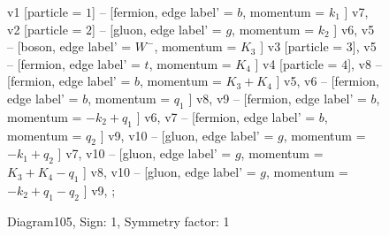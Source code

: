 \documentclass{revtex4}
\begin{document}
\begin{figure}[!htb]
\begin{center}
{v1 [particle = \(1\)] -- [fermion, edge label' = \(b\), momentum = \(k_{1}\) ] v7, 
v2 [particle = \(2\)] -- [gluon, edge label' = \(g\), momentum = \(k_{2}\) ] v6, 
v5 -- [boson, edge label' = \(W^{-}\), momentum = \(K_{3}\) ] v3 [particle = \(3\)], 
v5 -- [fermion, edge label' = \(t\), momentum = \(K_{4}\) ] v4 [particle = \(4\)], 
v8 -- [fermion, edge label' = \(b\), momentum = \(K_{3} + K_{4}\) ] v5, 
v6 -- [fermion, edge label' = \(b\), momentum = \(q_{1}\) ] v8, 
v9 -- [fermion, edge label' = \(b\), momentum = \(-k_{2} + q_{1}\) ] v6, 
v7 -- [fermion, edge label' = \(b\), momentum = \(q_{2}\) ] v9, 
v10 -- [gluon, edge label' = \(g\), momentum = \(-k_{1} + q_{2}\) ] v7, 
v10 -- [gluon, edge label' = \(g\), momentum = \(K_{3} + K_{4} - q_{1}\) ] v8, 
v10 -- [gluon, edge label' = \(g\), momentum = \(-k_{2} + q_{1} - q_{2}\) ] v9, 
};
\end{center}
\caption{Diagram105, Sign: 1, Symmetry factor: 1}
\end{figure}
\newpage
\end{document}
